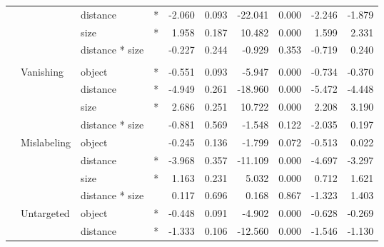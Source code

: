 \begin{longtable}[t]{llllrrrrrr}
\cmidrule{3-10}\nopagebreak
\hspace{1em} &  & distance & * & -2.060 & 0.093 & -22.041 & 0.000 & -2.246 & -1.879\\
\cmidrule{3-10}\nopagebreak
\hspace{1em} &  & size & * & 1.958 & 0.187 & 10.482 & 0.000 & 1.599 & 2.331\\
\cmidrule{3-10}\nopagebreak
\hspace{1em} &  & distance * size &  & -0.227 & 0.244 & -0.929 & 0.353 & -0.719 & 0.240\\
\cmidrule{1-10}\pagebreak[0]
\addlinespace[0.3em]
\multicolumn{10}{l}{\textbf{RetinaNet}}\\
\hspace{1em} & Vanishing & object & * & -0.551 & 0.093 & -5.947 & 0.000 & -0.734 & -0.370\\
\cmidrule{3-10}\nopagebreak
\hspace{1em} &  & distance & * & -4.949 & 0.261 & -18.960 & 0.000 & -5.472 & -4.448\\
\cmidrule{3-10}\nopagebreak
\hspace{1em} &  & size & * & 2.686 & 0.251 & 10.722 & 0.000 & 2.208 & 3.190\\
\cmidrule{3-10}\nopagebreak
\hspace{1em} &  & distance * size &  & -0.881 & 0.569 & -1.548 & 0.122 & -2.035 & 0.197\\
\cmidrule{2-10}\nopagebreak
\hspace{1em} & Mislabeling & object &  & -0.245 & 0.136 & -1.799 & 0.072 & -0.513 & 0.022\\
\cmidrule{3-10}\nopagebreak
\hspace{1em} &  & distance & * & -3.968 & 0.357 & -11.109 & 0.000 & -4.697 & -3.297\\
\cmidrule{3-10}\nopagebreak
\hspace{1em} &  & size & * & 1.163 & 0.231 & 5.032 & 0.000 & 0.712 & 1.621\\
\cmidrule{3-10}\nopagebreak
\hspace{1em} &  & distance * size &  & 0.117 & 0.696 & 0.168 & 0.867 & -1.323 & 1.403\\
\cmidrule{2-10}\nopagebreak
\hspace{1em} & Untargeted & object & * & -0.448 & 0.091 & -4.902 & 0.000 & -0.628 & -0.269\\
\cmidrule{3-10}\nopagebreak
\hspace{1em} &  & distance & * & -1.333 & 0.106 & -12.560 & 0.000 & -1.546 & -1.130\\

\end{longtable}
